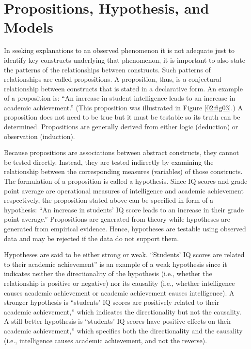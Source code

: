 \section{Propositions, Hypothesis, and Models}

In seeking explanations to an observed phenomenon it is not adequate just to identify key constructs underlying that phenomenon, it is important to also state the patterns of the relationships between constructs. Such patterns of relationships are called propositions. A proposition, thus, is a conjectural relationship between constructs that is stated in a declarative form. An example of a proposition is: ``An increase in student intelligence leads to an increase in academic achievement.'' (This proposition was illustrated in Figure \ref{02:fig03}.) A proposition does not need to be true but it must be testable so its truth can be determined. Propositions are generally derived from either logic (deduction) or observation (induction).

Because propositions are associations between abstract constructs, they cannot be tested directly. Instead, they are tested indirectly by examining the relationship between the corresponding measures (variables) of those constructs. The formulation of a proposition is called a \gls{hypothesis}. Since IQ scores and grade point average are operational measures of intelligence and academic achievement respectively, the proposition stated above can be specified in form of a hypothesis: ``An increase in students' IQ score leads to an increase in their grade point average.'' Propositions are generated from theory while hypotheses are generated from empirical evidence. Hence, hypotheses are testable using observed data and may be rejected if the data do not support them. 

Hypotheses are said to be either strong or weak. ``Students' IQ scores are related to their academic achievement'' is an example of a weak hypothesis since it indicates neither the directionality of the hypothesis (i.e., whether the relationship is positive or negative) nor its causality (i.e., whether intelligence causes academic achievement or academic achievement causes intelligence). A stronger hypothesis is ``students' IQ scores are positively related to their academic achievement,'' which indicates the directionality but not the causality. A still better hypothesis is ``students' IQ scores have positive effects on their academic achievement,'' which specifies both the directionality and the causality (i.e., intelligence causes academic achievement, and not the reverse).

